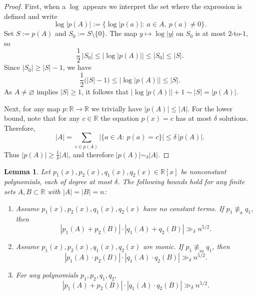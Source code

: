 \documentclass[12pt,reqno]{amsart}
\numberwithin{equation}{section}
\newtheorem{lemma}[theorem]{Lemma}
\begin{document}
\begin{proof}
First, when a $\log$ appears we interpret the set where the expression is defined and write
\[
\log|p(A)|:=\{\log|p(a)|:\ a\in A,\ p(a)\neq 0\}.
\]
Set $S:=p(A)$ and $S_0:=S\setminus\{0\}$.
The map $y\mapsto \log|y|$ on $S_0$ is at most $2$-to-$1$, so
\[
\frac12\,\Big|S_0\Big|\le \Big|\log|p(A)|\Big|\le \Big|S_0\Big|\le \Big|S\Big|.
\]
Since $\Big|S_0\Big|\ge \Big|S\Big|-1$, we have
\[
\frac12\big(\Big|S\Big|-1\big)\le \Big|\log|p(A)|\Big|\le \Big|S\Big|.
\]
As $A\neq\varnothing$ implies $\Big|S\Big|\ge 1$, it follows that
$\Big|\log|p(A)|\Big|+1\sim \Big|S\Big|=\Big|p(A)\Big|$.

Next, for any map $p:\mathbb R\to\mathbb R$ we trivially have $\Big|p(A)\Big|\le \Big|A\Big|$.
For the lower bound, note that for any $c\in\mathbb R$ the equation $p(x)=c$ has at most $\delta$
solutions. Therefore,
\[
\Big|A\Big|
=\sum_{c\in p(A)} \Big|\{a\in A:\ p(a)=c\}\Big|
\le \delta\,\Big|p(A)\Big|.
\]
Thus $\Big|p(A)\Big|\ge \frac{1}{\delta}\Big|A\Big|$, and therefore
$\Big|p(A)\Big|\sim_{\delta}\Big|A\Big|$.
\end{proof}
\begin{lemma}\label{lem:sum}
Let $p_1(x), p_2(x), q_1(x), q_2(x) \in \mathbb{R}[x]$ be nonconstant polynomials,
each of degree at most $\delta$.
The following bounds hold for any finite sets $A, B \subset \mathbb{R}$ with
$|A| = |B| = n$:
\begin{enumerate}
\item[(i)] Assume $p_1(x), p_2(x), q_1(x), q_2(x)$ have no constant terms.
If $p_{1}\not\equiv_{a}q_{1}$, then
\[
|p_1(A) + p_2(B)| \cdot |q_1(A) + q_2(B)| \gg_{\delta} n^{5/2}.
\]
\item[(ii)] Assume $p_1(x), p_2(x), q_1(x), q_2(x)$ are monic.
If $p_{1}\not\equiv_{m}q_{1}$, then
\[
|p_1(A) \cdot p_2(B)| \cdot |q_1(A) \cdot q_2(B)| \gg_{\delta} n^{5/2}.
\]
\item[(iii)] For any polynomials $p_{1},p_{2},q_{1},q_{2}$,
\[
|p_1(A) + p_2(B)| \cdot |q_1(A) \cdot q_2(B)| \gg_{\delta} n^{5/2}.
\]
\end{enumerate}
\end{lemma}
\end{document}
